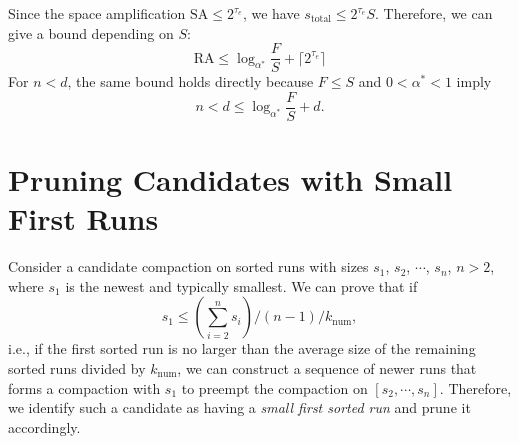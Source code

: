 \documentclass[sigconf]{acmart}
\begin{document}
Since the space amplification $\text{SA} \leq 2^{\tau_e}$, we have $s_\text{total} \le 2^{\tau_e} S$. Therefore, we can give a bound depending on $S$:
$$
\text{RA} \leq \log_{\alpha^*}\frac{F}{S} + \lceil 2^{\tau_e} \rceil
$$
For $n<d$, the same bound holds directly because $F \le S$ and $0 < \alpha^* < 1$ imply
$$
n < d \le \log_{\alpha^*} \frac{F}{S} + d.
$$

\section{Pruning Candidates with Small First Runs}

Consider a candidate compaction on sorted runs with sizes $s_1$, $s_2$, $\cdots$, $s_n$, $n>2$, where $s_1$ is the newest and typically smallest. We can prove that if
\begin{equation}\label{math:first-is-small}
s_1 \leq (\sum_{i=2}^{n} s_i) / (n-1) / k_\text{num},
\end{equation}
i.e., if the first sorted run is no larger than the average size of the remaining sorted runs divided by $k_\text{num}$, we can construct a sequence of newer runs that forms a compaction with $s_1$ to preempt the compaction on $[s_2, \cdots, s_{n}]$. Therefore, we identify such a candidate as having a \emph{small first sorted run} and prune it accordingly.
\end{document}
